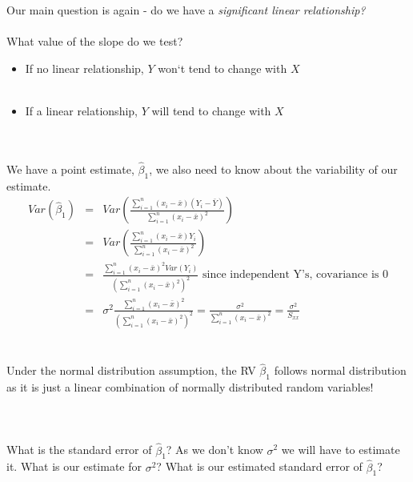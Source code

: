 Our main question is again - do we have a \textit{significant linear relationship?}\\~\\

What value of the slope do we test?
\begin{itemize}
\item If no linear relationship, $Y$ won`t tend to change with $X$\\~\\
\item If a linear relationship, $Y$ will tend to change with $X$ \\~\\
\end{itemize}
~\\

We have a point estimate, $\hat{\beta}_1$, we also need to know about the variability of our estimate.
\begin{eqnarray*}
Var(\hat{\beta}_1)&=&Var\left(\frac{\sum_{i=1}^{n} (x_i-\bar{x})(Y_i-\bar{Y})}{\sum_{i=1}^{n} (x_i-\bar{x})^2}\right)\\
&=&Var\left(\frac{\sum_{i=1}^{n} (x_i-\bar{x})Y_i}{\sum_{i=1}^{n} (x_i-\bar{x})^2}\right)\\
&=&\frac{\sum_{i=1}^{n} (x_i-\bar{x})^2Var(Y_i)}{\left(\sum_{i=1}^{n} (x_i-\bar{x})^2\right)^2} \mbox{    since independent Y's, covariance is 0}\\
&=&\sigma^2\frac{\sum_{i=1}^{n} (x_i-\bar{x})^2}{\left(\sum_{i=1}^{n} (x_i-\bar{x})^2\right)^2}=\frac{\sigma^2}{\sum_{i=1}^{n} (x_i-\bar{x})^2}=\frac{\sigma^2}{S_{xx}}
\end{eqnarray*}
~\\~\\

Under the normal distribution assumption, the RV $\hat\beta_1$ follows normal distribution as it is just a linear combination of normally distributed random variables!\\~\\~\\~\\

What is the standard error of $\hat{\beta}_1$?  As we don't know $\sigma^2$ we will have to estimate it.  What is our estimate for $\sigma^2$?  What is our estimated standard error of $\hat{\beta}_1$?\\~\\~\\~\\~\\~\\~\\

